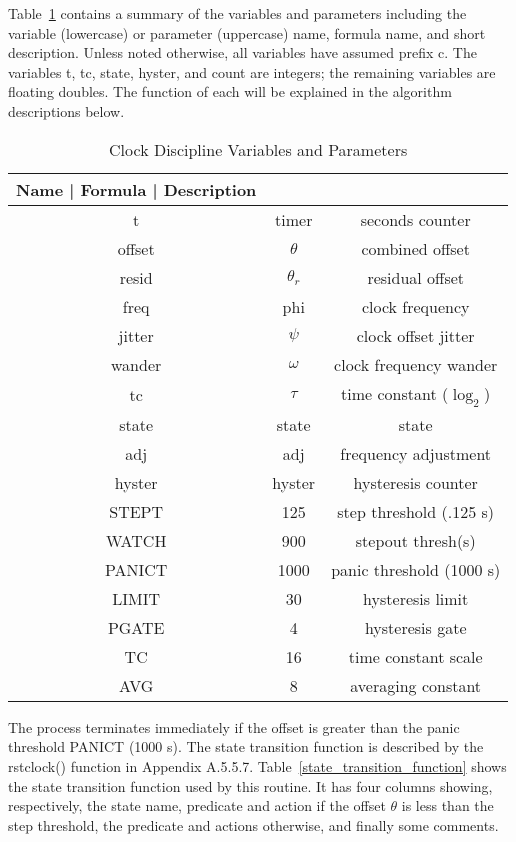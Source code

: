 Table~\ref{clock_discipline_variables_and_parameters} contains a summary of the variables and parameters
including the variable (lowercase) or parameter (uppercase) name,
formula name, and short description.  Unless noted otherwise, all
variables have assumed prefix c.  The variables t, tc, state, hyster,
and count are integers; the remaining variables are floating doubles.
The function of each will be explained in the algorithm descriptions
below.

\begin{table}[htb]
\center
\begin{tabular}{c | c | c}
Name   | Formula    | Description              \\
\hline
\hline
t      & timer      & seconds counter          \\
offset & $ \theta $      & combined offset          \\
resid  & $ \theta_r $   & residual offset          \\
freq   & phi        & clock frequency          \\
jitter & $ \psi $        & clock offset jitter      \\
wander & $ \omega $      & clock frequency wander   \\
tc     & $ \tau $        & time constant ($ \log_2 $)     \\
state  & state      & state                    \\
adj    & adj        & frequency adjustment     \\
hyster & hyster     & hysteresis counter       \\
STEPT  & 125        & step threshold (.125 s)  \\
WATCH  & 900        & stepout thresh(s)        \\
PANICT & 1000       & panic threshold (1000 s) \\
LIMIT  & 30         & hysteresis limit         \\
PGATE  & 4          & hysteresis gate          \\
TC     & 16         & time constant scale      \\
AVG    & 8          & averaging constant       \\
\hline
\end{tabular}
\label{clock_discipline_variables_and_parameters}
\caption{Clock Discipline Variables and Parameters}
\end{table}

The process terminates immediately if the offset is greater than the
panic threshold PANICT (1000 s).  The state transition function is
described by the rstclock() function in Appendix A.5.5.7.  Table~\ref{state_transition_function}
shows the state transition function used by this routine.  It has
four columns showing, respectively, the state name, predicate and
action if the offset $ \theta $ is less than the step threshold, the
predicate and actions otherwise, and finally some comments.

